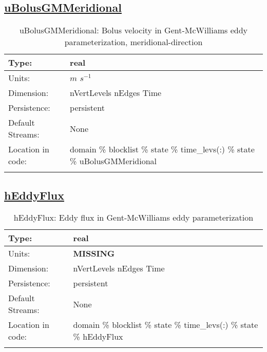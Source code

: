 \subsection[uBolusGMMeridional]{\hyperref[sec:var_tab_state]{uBolusGMMeridional}}
\label{subsec:var_sec_state_uBolusGMMeridional}
\begin{center}
\begin{longtable}{| p{2.0in} | p{4.0in} |}
        \hline 
        Type: & real \\
        \hline 
        Units: & $m$ $s^{-1}$ \\
        \hline 
        Dimension: & nVertLevels nEdges Time \\
        \hline 
        Persistence: & persistent \\
        \hline 
		 Default Streams: & None \\
        \hline 
		 Location in code: & domain \% blocklist \% state \% time\_levs(:) \% state \% uBolusGMMeridional \\
		 \hline 
    \caption{uBolusGMMeridional: Bolus velocity in Gent-McWilliams eddy parameterization, meridional-direction}
\end{longtable}
\end{center}
\subsection[hEddyFlux]{\hyperref[sec:var_tab_state]{hEddyFlux}}
\label{subsec:var_sec_state_hEddyFlux}
\begin{center}
\begin{longtable}{| p{2.0in} | p{4.0in} |}
        \hline 
        Type: & real \\
        \hline 
        Units: & {\bf \color{red} MISSING} \\
        \hline 
        Dimension: & nVertLevels nEdges Time \\
        \hline 
        Persistence: & persistent \\
        \hline 
		 Default Streams: & None \\
        \hline 
		 Location in code: & domain \% blocklist \% state \% time\_levs(:) \% state \% hEddyFlux \\
		 \hline 
    \caption{hEddyFlux: Eddy flux in Gent-McWilliams eddy parameterization}
\end{longtable}
\end{center}
